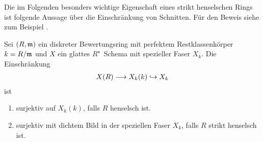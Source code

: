 Die im Folgenden besonders wichtige Eigenschaft eines strikt
henselschen Rings ist folgende Aussage über die Einschränkung von
Schnitten. Für den Beweis siehe zum Beispiel
\cite[Proposition~IV.6.4]{silverman2}.
\begin{Satz}
  \label{thm:eigstrikthenselsch}
  Sei $(R,\mathfrak{m})$ ein diskreter Bewertungsring mit perfektem
  Restklassenkörper $k=R/\mathfrak{m}$ und $X$ ein glattes $R$"~Schema mit
  spezieller Faser $X_k$.
  Die Einschränkung
  \begin{gather*}
    X(R)\longrightarrow X_k(k)\hookrightarrow X_k
  \end{gather*}
  ist
  \begin{enumerate}[label=(\alph*)]
  \item surjektiv auf $X_k(k)$, falls $R$ henselsch ist.
  \item surjektiv mit dichtem Bild in der speziellen Faser $X_k$,
    falls $R$ strikt henselsch ist.
  \end{enumerate}
\end{Satz}

